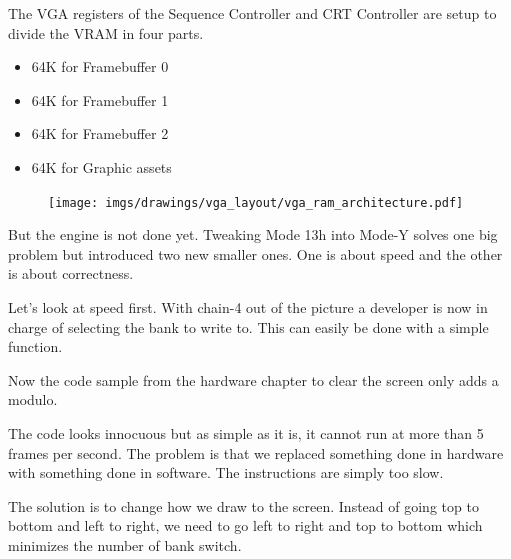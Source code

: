 \documentclass[book.tex]{subfiles}
\begin{document}
 \par
 \begin{minipage}{\textwidth}

\end{minipage}
 \par
 The VGA registers of the Sequence Controller and CRT Controller are setup to divide the VRAM in four parts.
 \begin{itemize}\label{SetupPages}
 \item 64K for Framebuffer 0
 \item 64K for Framebuffer 1
 \item 64K for Framebuffer 2
 \item 64K for Graphic assets
\end{itemize}
\par
\begin{figure}[H]
\centering
 \texttt{[image: imgs/drawings/vga\_layout/vga\_ram\_architecture.pdf]}
 \end{figure}
\par
But the engine is not done yet. Tweaking Mode 13h into Mode-Y solves one big problem but introduced two new smaller ones. One is about speed and the other is about correctness.\\
\par
Let's look at speed first. With chain-4 out of the picture a developer is now in charge of selecting the bank to write to. This can easily be done with a simple function.\\
\par
 \par
 \begin{minipage}{\textwidth}

\end{minipage}
 \par

Now the code sample from the hardware chapter to clear the screen only adds a modulo.\\
\par
\par
\begin{minipage}{\textwidth}

\end{minipage}
\par
The code looks innocuous but as simple as it is, it cannot run at more than 5 frames per second. The problem is that we replaced something done in hardware with something done in software. The  instructions are simply too slow.\\
\par
The solution is to change how we draw to the screen. Instead of going top to bottom and left to right, we need to go left to right and top to bottom which minimizes the number of bank switch.\\
\par
\begin{minipage}{\textwidth}

\end{minipage}
\end{document}
